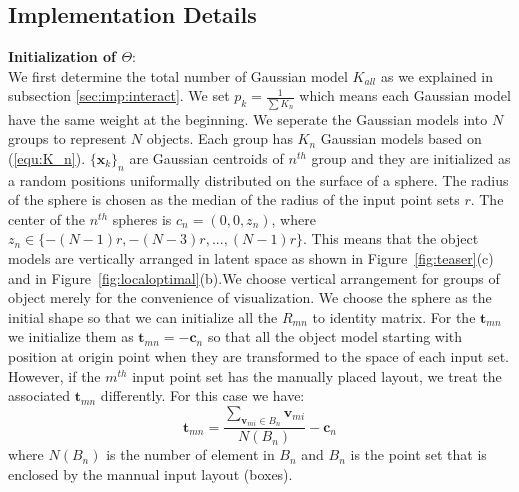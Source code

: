 \subsection{Implementation Details}
\textbf{Initialization of $\Theta$}:\\
We first determine the total number of Gaussian model $K_{all}$ as we explained in subsection \ref{sec:imp:interact}. We set $p_k=\frac{1}{\sum K_n}$ which means each Gaussian model have the same weight at the beginning. We seperate the Gaussian models into $N$ groups to represent $N$ objects. Each group has $K_n$ Gaussian models based on (\ref{equ:K_n}). $\{\pmb x_k\}_n$ are Gaussian centroids of $n^{th}$ group and they are initialized as a random positions uniformally distributed on the surface of a sphere. The radius of the sphere is chosen as the median of the radius of the input point sets $r$. The center of the $n^{th}$ spheres is $c_n=(0,0,z_n)$, where $z_n\in \{-(N-1)r,-(N-3)r,...,(N-1)r\}$. This means that the object models are vertically arranged in latent space as shown in Figure~\ref{fig:teaser}(c) and in Figure~\ref{fig:localoptimal}(b).We choose vertical arrangement for groups of object merely for the convenience of visualization. We choose the sphere as the initial shape so that we can initialize all the $R_{mn}$ to identity matrix. For the $\pmb t_{mn}$ we initialize them as $\pmb t_{mn}=- \pmb c_n$ so that all the object model starting with position at origin point when they are transformed to the space of each input set. However, if the $m^{th}$ input point set has the manually placed layout, we treat the associated $\pmb t_{mn}$ differently. For this case we have:
\begin{equation}
\label{equ:initt}
\pmb t_{mn}=\frac{\sum_{\pmb v_{mi} \in B_n}\pmb v_{mi}}{N(B_n)}-\pmb c_n
\end{equation}
where $N(B_n)$ is the number of element in $B_n$ and $B_n$ is the point set that is enclosed by the mannual input layout (boxes). 
